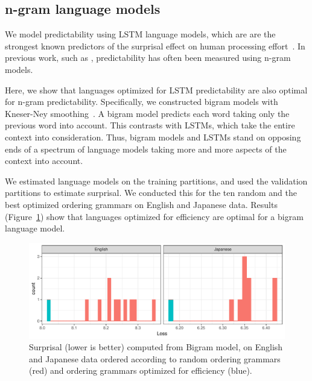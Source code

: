 \documentclass[10pt,twoside,lineno]{article}
\begin{document}
\subsection{n-gram language models}

We model predictability using LSTM language models, which are are the strongest known predictors of the surprisal effect on human processing effort~\citep{frank2011insensitivity,goodkind2018predictive}.
In previous work, such as \cite{gildea2015human}, predictability has often been measured using n-gram models.

Here, we show that languages optimized for LSTM predictability are also optimal for n-gram predictability.
Specifically, we constructed bigram models with Kneser-Ney smoothing~\cite{kneser1995improved, chen1999empirical}.
A bigram model predicts each word taking only the previous word into account.
This contrasts with LSTMs, which take the entire context into consideration.
Thus, bigram models and LSTMs stand on opposing ends of a spectrum of language models taking more and more aspects of the context into account.

We estimated language models on the training partitions, and used the validation partitions to estimate surprisal.
We conducted this for the ten random and the best optimized ordering grammars on English and Japanese data.
Results (Figure~\ref{fig:bigrams}) show that languages optimized for efficiency are optimal for a bigram language model.

\begin{figure}
    \centering
    \includegraphics[scale=.6]{../results/bigrams/bigrams.pdf} 
	\caption{Surprisal (lower is better) computed from Bigram model, on English and Japanese data ordered according to random ordering grammars (red) and ordering grammars optimized for efficiency (blue).}
    \label{fig:bigrams}
\end{figure}




%
\end{document}
